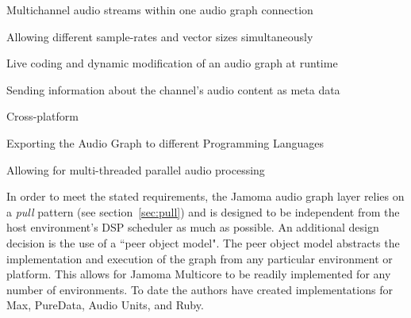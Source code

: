\documentclass[twoside,a4paper]{article}
\newenvironment{packed_item}{
\begin{itemize}
  \setlength{\itemsep}{1pt}
  \setlength{\parskip}{0pt}
  \setlength{\parsep}{0pt}
}{\end{itemize}}
\begin{document}

\begin{packed_item}

\item{Multichannel audio streams within one audio graph connection}
\item{Allowing different sample-rates and vector sizes simultaneously}  
\item{Live coding and dynamic modification of an audio graph at runtime}    
\item{Sending information about the channel's audio content as meta data}  
\item{Cross-platform}
\item{Exporting the Audio Graph to different Programming Languages}
\item{Allowing for multi-threaded parallel audio processing}

   
\end{packed_item}	


In order to meet the stated requirements, the Jamoma audio graph layer relies on a \emph{pull} pattern (see section~\ref{sec:pull}) and is designed to be independent from the host environment's DSP scheduler as much as possible.
An additional design decision is the use of a ``peer object model".  
The peer object model abstracts the implementation and execution of the graph from any particular environment or platform.  
This allows for Jamoma Multicore to be readily implemented for any number of environments.  
To date the authors have created implementations for Max, PureData, Audio Units, and Ruby.
\end{document}
